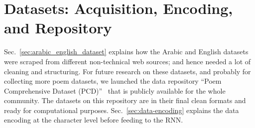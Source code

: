 \documentclass[journal,10pt,twocolumns,letter]{IEEEtran}
\begin{document}
\section{Datasets: Acquisition, Encoding, and Repository}\label{sec:datasets}
Sec.~\ref{sec:arabic_english_dataset} explains how the Arabic and English datasets were scraped from
different non-technical web sources; and hence needed a lot of cleaning and structuring. For future research on
these datasets, and probably for collecting more poem datasets, we launched the data repository
``Poem Comprehensive Dataset (PCD)''~\citep{Yousef2018PoemComprehensiveDataset} that is publicly
available for the whole community. The datasets on this repository are in their final clean formats
and ready for computational purposes. Sec.~\ref{sec:data-encoding} explains the data encoding at the
character level before feeding to the RNN\@.
\end{document}
